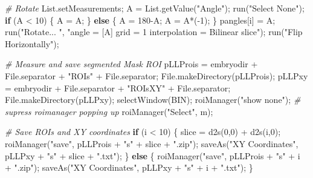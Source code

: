 \documentclass[10pt, b5paper, singlespacinge, twoside]{reedthesis} %
\newenvironment{Shaded}{}{}
\newcommand{\CommentTok}[1]{\textit{#1}}
\newcommand{\ControlFlowTok}[1]{\textbf{#1}}
\newcommand{\DecValTok}[1]{#1}
\newcommand{\FunctionTok}[1]{#1}
\newcommand{\NormalTok}[1]{#1}
\newcommand{\OtherTok}[1]{#1}
\newcommand{\SpecialCharTok}[1]{#1}
\newcommand{\StringTok}[1]{#1}
\theoremstyle{definition}
\theoremstyle{definition}
\theoremstyle{definition}
\theoremstyle{remark}
\begin{document}
\begin{Shaded}
\begin{Highlighting}[numbers=left,,]
  \CommentTok{\# Rotate}
\NormalTok{        List.setMeasurements;}
\NormalTok{        A }\OtherTok{=} \FunctionTok{List.getValue}\NormalTok{(}\StringTok{"Angle"}\NormalTok{);}
        \FunctionTok{run}\NormalTok{(}\StringTok{"Select None"}\NormalTok{);}
        \ControlFlowTok{if}\NormalTok{ (A }\SpecialCharTok{\textless{}} \DecValTok{10}\NormalTok{) \{}
\NormalTok{            A }\OtherTok{=}\NormalTok{ A;}
\NormalTok{        \} }\ControlFlowTok{else}\NormalTok{ \{}
\NormalTok{            A }\OtherTok{=} \DecValTok{180}\SpecialCharTok{{-}}\NormalTok{A;}
\NormalTok{            A }\OtherTok{=}\NormalTok{ A}\SpecialCharTok{*}\NormalTok{(}\SpecialCharTok{{-}}\DecValTok{1}\NormalTok{);}
\NormalTok{        \}}
\NormalTok{        pangles[i] }\OtherTok{=}\NormalTok{ A;}
        \FunctionTok{run}\NormalTok{(}\StringTok{"Rotate... "}\NormalTok{, }\StringTok{"angle = [A] grid = 1 interpolation = Bilinear slice"}\NormalTok{);}
        \FunctionTok{run}\NormalTok{(}\StringTok{"Flip Horizontally"}\NormalTok{);}
            
  \CommentTok{\# Measure and save segmented Mask ROI}
\NormalTok{        pLLProis }\OtherTok{=}\NormalTok{ embryodir }\SpecialCharTok{+}\NormalTok{ File.separator }\SpecialCharTok{+} \StringTok{"ROIs"} \SpecialCharTok{+}\NormalTok{ File.separator;}
        \FunctionTok{File.makeDirectory}\NormalTok{(pLLProis);}
\NormalTok{        pLLPxy }\OtherTok{=}\NormalTok{ embryodir }\SpecialCharTok{+}\NormalTok{ File.separator }\SpecialCharTok{+} \StringTok{"ROIsXY"} \SpecialCharTok{+}\NormalTok{ File.separator;}
        \FunctionTok{File.makeDirectory}\NormalTok{(pLLPxy);}
        \FunctionTok{selectWindow}\NormalTok{(BIN);}
        \FunctionTok{roiManager}\NormalTok{(}\StringTok{"show none"}\NormalTok{); }\CommentTok{\# supress roimanager popping up}
        \FunctionTok{roiManager}\NormalTok{(}\StringTok{"Select"}\NormalTok{, m);}
            
    \CommentTok{\#   Save ROIs and XY coordinates}
        \ControlFlowTok{if}\NormalTok{ (i }\SpecialCharTok{\textless{}} \DecValTok{10}\NormalTok{) \{}
\NormalTok{            slice }\OtherTok{=} \FunctionTok{d2s}\NormalTok{(}\DecValTok{0}\NormalTok{,}\DecValTok{0}\NormalTok{) }\SpecialCharTok{+} \FunctionTok{d2s}\NormalTok{(i,}\DecValTok{0}\NormalTok{);}
            \FunctionTok{roiManager}\NormalTok{(}\StringTok{"save"}\NormalTok{, pLLProis }\SpecialCharTok{+} \StringTok{"s"} \SpecialCharTok{+}\NormalTok{ slice }\SpecialCharTok{+} \StringTok{".zip"}\NormalTok{);}
            \FunctionTok{saveAs}\NormalTok{(}\StringTok{"XY Coordinates"}\NormalTok{, pLLPxy }\SpecialCharTok{+} \StringTok{"s"} \SpecialCharTok{+}\NormalTok{ slice }\SpecialCharTok{+} \StringTok{".txt"}\NormalTok{);}
\NormalTok{        \} }\ControlFlowTok{else}\NormalTok{ \{}
            \FunctionTok{roiManager}\NormalTok{(}\StringTok{"save"}\NormalTok{, pLLProis }\SpecialCharTok{+} \StringTok{"s"} \SpecialCharTok{+}\NormalTok{ i }\SpecialCharTok{+} \StringTok{".zip"}\NormalTok{);}
            \FunctionTok{saveAs}\NormalTok{(}\StringTok{"XY Coordinates"}\NormalTok{, pLLPxy }\SpecialCharTok{+} \StringTok{"s"} \SpecialCharTok{+}\NormalTok{ i }\SpecialCharTok{+} \StringTok{".txt"}\NormalTok{);}
\NormalTok{        \}}
            

\end{Highlighting}
\end{Shaded}
\end{document}
